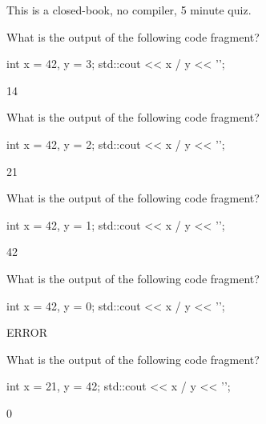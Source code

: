 

This is a closed-book, no compiler, 5 minute quiz.

\nextq
What is the output of the following code fragment?
\begin{console}[fontsize=\footnotesize]
int x = 42, y = 3;
std::cout << x / y << '\n';
\end{console}
\ANSWER
\begin{answercode}
14
\end{answercode}

\nextq
What is the output of the following code fragment?
\begin{console}[fontsize=\footnotesize]
int x = 42, y = 2;
std::cout << x / y << '\n';
\end{console}
\ANSWER
\begin{answercode}
21
\end{answercode}

\nextq
What is the output of the following code fragment?
\begin{console}[fontsize=\footnotesize]
int x = 42, y = 1;
std::cout << x / y << '\n';
\end{console}
\ANSWER
\begin{answercode}
42
\end{answercode}

\nextq
What is the output of the following code fragment?
\begin{console}[fontsize=\footnotesize]
int x = 42, y = 0;
std::cout << x / y << '\n';
\end{console}
\ANSWER
\begin{answercode}
ERROR
\end{answercode}

\nextq
What is the output of the following code fragment?
\begin{console}[fontsize=\footnotesize]
int x = 21, y = 42;
std::cout << x / y << '\n';
\end{console}
\ANSWER
\begin{answercode}
0
\end{answercode}

